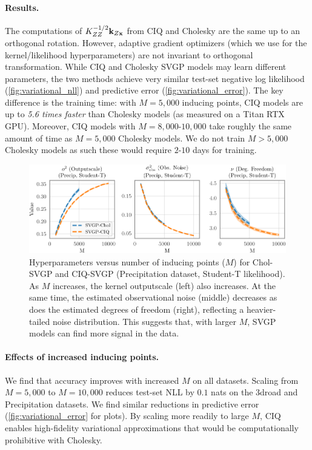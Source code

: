 \paragraph{Results.}
The computations of $K_{ZZ}^{-1/2} \mathbf{k}_{Z\mathbf{x}}$ from CIQ and Cholesky are the same up to an orthogonal rotation.
However, adaptive gradient optimizers (which we use for the kernel/likelihood hyperparameters) are not invariant to orthogonal transformation.
While CIQ and Cholesky SVGP models may learn different parameters, the two methods achieve very similar test-set negative log likelihood (\cref{fig:variational_nll}) and predictive error (\cref{fig:variational_error}).
The key difference is the training time:
with $M=5,\!000$ inducing points, CIQ models are up to \emph{5.6 times faster} than Cholesky models (as measured on a Titan RTX GPU).
Moreover, CIQ models with $M=8,\!000$-$10,\!000$ take roughly the same amount of time as $M=5,\!000$ Cholesky models.
We do not train $M > 5,\!000$ Cholesky models as such these would require $2$-$10$ days for training.

\begin{figure}[t!]
  \centering
  \includegraphics[width=\linewidth]{figures/variational_stats.pdf}
  \caption[Train time comparison of Cholesky-whitened vs CIQ-whitened SVGP models.]{
    Hyperparameters versus number of inducing points ($M$) for Chol-SVGP and CIQ-SVGP (Precipitation dataset, Student-T likelihood).
    As $M$ increases, the kernel outputscale (left) also increases.
    At the same time, the estimated observational noise (middle) decreases as does the estimated degrees of freedom (right), reflecting a heavier-tailed noise distribution.
    This suggests that, with larger $M$, SVGP models can find more signal in the data.
  }
  \label{fig:variational_stats}
\end{figure}

\paragraph{Effects of increased inducing points.}
We find that accuracy improves with increased $M$ on all datasets.
Scaling from $M=5,\!000$ to $M=10,\!000$ reduces test-set NLL by $0.1$ nats on the 3droad and Precipitation datasets.
We find similar reductions in predictive error (\cref{fig:variational_error} for plots).
By scaling more readily to large $M$, CIQ enables high-fidelity variational approximations that would be computationally prohibitive with Cholesky.


